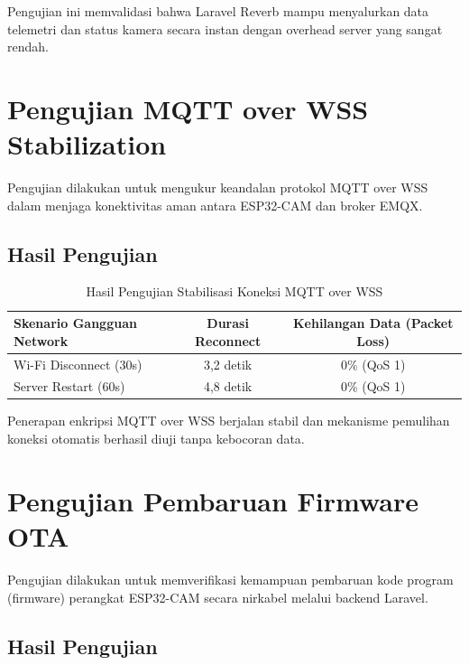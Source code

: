 Pengujian ini memvalidasi bahwa Laravel Reverb mampu menyalurkan data telemetri dan status kamera secara instan dengan overhead server yang sangat rendah.

\section{Pengujian MQTT over WSS Stabilization}

Pengujian dilakukan untuk mengukur keandalan protokol MQTT over WSS dalam menjaga konektivitas aman antara ESP32-CAM dan broker EMQX.

\subsection{Hasil Pengujian}

\begin{table}[H]
	\centering
	\caption{Hasil Pengujian Stabilisasi Koneksi MQTT over WSS}
	\begin{tabular}{|l|c|c|}
		\hline
		Skenario Gangguan Network & Durasi Reconnect & Kehilangan Data (Packet Loss) \\
		\hline
		Wi-Fi Disconnect (30s) & 3,2 detik & 0\% (QoS 1) \\
		Server Restart (60s) & 4,8 detik & 0\% (QoS 1) \\
		\hline
	\end{tabular}
\end{table}

Penerapan enkripsi MQTT over WSS berjalan stabil dan mekanisme pemulihan koneksi otomatis berhasil diuji tanpa kebocoran data.

\section{Pengujian Pembaruan Firmware OTA}

Pengujian dilakukan untuk memverifikasi kemampuan pembaruan kode program (firmware) perangkat ESP32-CAM secara nirkabel melalui backend Laravel.

\subsection{Hasil Pengujian}

